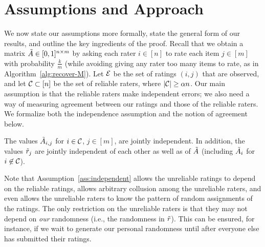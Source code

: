 \section{Assumptions and Approach}
\label{sec:assumptions}
\label{sec:approach}

We now state our assumptions more formally, state the general form 
of our results, and outline the key ingredients of the proof.
Recall that we obtain a matrix $\tilde{A} \in [0,1]^{n \times m}$ by asking each 
rater $i \in [n]$ to rate each item $j \in [m]$ with probability $\frac{k}{m}$ 
(while avoiding giving any rater too many items to rate, as in Algorithm~\ref{alg:recover-M}).
Let $\mathcal{E}$ be the set of ratings $(i,j)$ that are observed, and let $\mathcal{C} \subset [n]$ 
be the set of reliable raters, where $|\mathcal{C}| \geq \alpha n$.
Our main assumption is that the reliable raters make independent errors; we also 
need a way of measuring agreement between our ratings and those of the reliable 
raters.
We formalize both the 
independence assumption and the notion of agreement below.

\begin{assumption}[Independence]
\label{ass:independent}
The values $\tilde{A}_{i,j}$ for $i \in \mathcal{C}$, $j \in [m]$, are 
jointly independent.
In addition, the values $\tilde{r}_j$ are jointly independent 
of each other as well as of $\tilde{A}$ (including $\tilde{A}_i$ for $i \not \in \mathcal{C}$).
\end{assumption}
Note that Assumption~\ref{ass:independent} allows the unreliable ratings to 
depend on the reliable ratings, allows arbitrary collusion among the unreliable 
raters, and even allows the unreliable raters to know the pattern of random 
assignments of the ratings. The only restriction on the unreliable raters is 
that they may not depend on \emph{our} randomness (i.e., the randomness in 
$\tilde{r}$). This can be ensured, for instance, if we wait to generate our 
personal randomness until after everyone else has submitted their ratings. 

